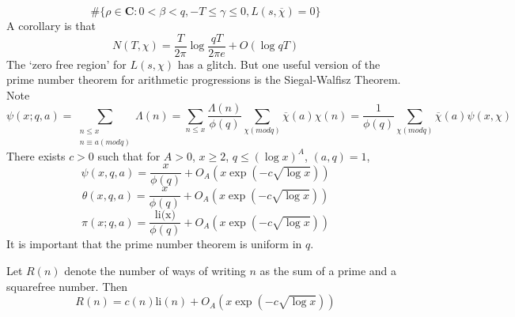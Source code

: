 %
\[ \# \{ \rho \in \mathbf{C}: 0 < \beta < q, - T \leq \gamma \leq 0, L(s,\overline{\chi}) = 0 \} \]
%
A corollary is that
%
\[ N(T,\chi) = \frac{T}{2\pi} \log \frac{qT}{2\pi e} + O(\log q T) \]
%
The `zero free region' for $L(s,\chi)$ has a glitch. But one useful version of the prime number theorem for arithmetic progressions is the Siegal-Walfisz Theorem. Note
%
\[ \psi(x;q,a) = \sum_{\substack{n \leq x\\n \equiv a (mod q)}} \Lambda(n) = \sum_{n \leq x} \frac{\Lambda(n)}{\phi(q)} \sum_{\chi (mod q)} \overline{\chi}(a) \chi(n) = \frac{1}{\phi(q)} \sum_{\chi (mod q)} \overline{\chi}(a) \psi(x,\chi) \]
%
There exists $c > 0$ such that for $A > 0$, $x \geq 2$, $q \leq (\log x)^A$, $(a,q) = 1$,
%
\[ \psi(x,q,a) = \frac{x}{\phi(q)} + O_A(x \exp(-c \sqrt{\log x})) \]
\[ \theta(x,q,a) = \frac{x}{\phi(q)} + O_A(x \exp(-c \sqrt{\log x})) \]
\[ \pi(x;q,a) = \frac{\text{li(x)}}{\phi(q)} + O_A(x \exp(-c \sqrt{\log x})) \]
%
It is important that the prime number theorem is uniform in $q$.

\begin{theorem}
    Let $R(n)$ denote the number of ways of writing $n$ as the sum of a prime and a squarefree number. Then
    \[ R(n) = c(n) \text{li}(n) + O_A(x \exp(-c \sqrt{\log x})) \]
\end{theorem}

